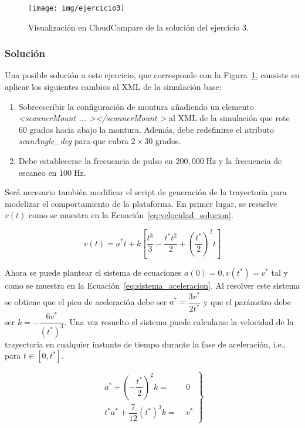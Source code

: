 \documentclass[]{article}
\begin{document}
	\begin{figure}[htb]
		\centering
		\texttt{[image: img/ejercicio3]}
		\caption{Visualización en CloudCompare de la solución del ejercicio 3.}
		\label{fig:ejercicio3}
	\end{figure} 

	
	\pagebreak

	\subsubsection*{Solución}
	Una posible solución a este ejercicio, que corresponde con la Figura~\ref{fig:ejercicio3}, consiste en aplicar los siguientes cambios al XML de la simulación base:
	
	\begin{enumerate}
		\item Sobreescribir la configuración de montura añadiendo un elemento \textit{\textless scannerMount ... \textgreater \textless /scannerMount \textgreater} al XML de la simulación que rote $60$ grados hacia abajo la montura. Además, debe redefinirse el atributo \textit{scanAngle\_deg} para que cubra $2 \times 30$ grados.
		\item Debe establecerse la frecuencia de pulso en $200,000\;\text{Hz}$ y la frecuencia de escaneo en $100\;\text{Hz}$.
	\end{enumerate}

	Será necesario también modificar el script de generación de la trayectoria para modelizar el comportamiento de la plataforma. En primer lugar, se resuelve $v(t)$ como se muestra en la Ecuación~\ref{eq:velocidad_solucion}.
	
	\begin{equation}
		v(t) = a^*t + k\left[
			\dfrac{t^3}{3} - \dfrac{t^*t^2}{2} + \left(\dfrac{t^*}{2}\right)^2t
		\right]
		\label{eq:velocidad_solucion}
	\end{equation}

	Ahora se puede plantear el sistema de ecuaciones $a(0)=0, v(t^*) = v^*$ tal y como se muestra en la Ecuación~\ref{eq:sistema_aceleracion}. Al resolver este sistema se obtiene que el pico de aceleración debe ser $a^* = \dfrac{3v^*}{2t^*}$ y que el parámetro debe ser $k=-\dfrac{6v^*}{(t^*)^3}$. Una vez resuelto el sistema puede calcularse la velocidad de la trayectoria en cualquier instante de tiempo durante la fase de aceleración, i.e., para $t \in [0, t^*]$.
	
	\begin{equation}
		\left.\begin{split}
			a^* + \left(-\dfrac{t^*}{2}\right)^2 k =&\; 0 \\
			t^* a^* + \dfrac{7}{12} (t^*)^3 k =&\; v^*
		\end{split}\right\}
	\label{eq:sistema_aceleracion}
	\end{equation}
\end{document}
